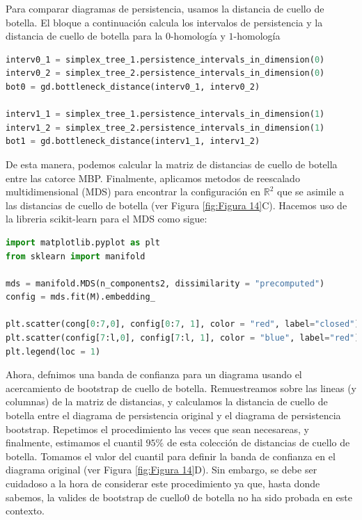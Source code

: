 Para comparar diagramas de persistencia, usamos la distancia de cuello de botella.
El bloque a continuaci\'on calcula los intervalos de persistencia y
la distancia de cuello de botella para la $0$-homolog\'ia y $1$-homolog\'ia

\begin{lstlisting}[language=Python]
interv0_1 = simplex_tree_1.persistence_intervals_in_dimension(0)
interv0_2 = simplex_tree_2.persistence_intervals_in_dimension(0)
bot0 = gd.bottleneck_distance(interv0_1, interv0_2)

interv1_1 = simplex_tree_1.persistence_intervals_in_dimension(1)
interv1_2 = simplex_tree_2.persistence_intervals_in_dimension(1)
bot1 = gd.bottleneck_distance(interv1_1, interv1_2)
\end{lstlisting}

De esta manera, podemos calcular la matriz de distancias de cuello de botella entre las
catorce MBP. Finalmente, aplicamos metodos de reescalado multidimensional (MDS) para
encontrar la configuraci\'on en $\mathbb{R}^{2}$ que se asimile a las distancias de
cuello de botella (ver Figura \ref{fig:Figura 14}C).
Hacemos uso de la libreria scikit-learn para el MDS como sigue:

\begin{lstlisting}[language=Python]
import matplotlib.pyplot as plt
from sklearn import manifold

mds = manifold.MDS(n_components2, dissimilarity = "precomputed")
config = mds.fit(M).embedding_

plt.scatter(cong[0:7,0], config[0:7, 1], color = "red", label="closed")
plt.scatter(config[7:l,0], config[7:l, 1], color = "blue", label="red")
plt.legend(loc = 1)
\end{lstlisting}

Ahora, defnimos una banda de confianza para un diagrama usando el acercamiento
de bootstrap de cuello  de botella.
Remuestreamos sobre las lineas (y columnas) de la matriz de distancias,
y calculamos la distancia de cuello de botella entre el diagrama de persistencia original
y el diagrama de persistencia bootstrap.
Repetimos el procedimiento las veces que sean necesareas, y finalmente, estimamos el
cuantil $95\%$ de esta colecci\'on de distancias de cuello de botella.
Tomamos el valor del cuantil para definir la banda de confianza en el diagrama original
(ver Figura \ref{fig:Figura 14}D).
Sin embargo, se debe ser cuidadoso a la hora de considerar este procedimiento ya que,
hasta donde sabemos, la valides de bootstrap de cuello0 de botella no ha sido probada
en este contexto.

